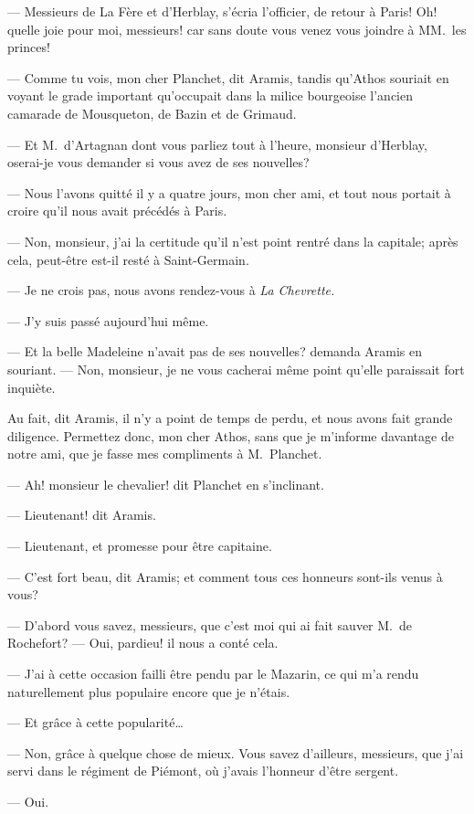 — Messieurs de La Fère et d'Herblay, s'écria l'officier, de retour à Paris! Oh! quelle joie pour moi, messieurs! car sans doute vous venez vous joindre à MM.~les princes!

— Comme tu vois, mon cher Planchet, dit Aramis, tandis qu'Athos souriait en voyant le grade important qu'occupait dans la milice bourgeoise l'ancien camarade de Mousqueton, de Bazin et de Grimaud.

— Et M.~d'Artagnan dont vous parliez tout à l'heure, monsieur d'Herblay, oserai-je vous demander si vous avez de ses nouvelles?

— Nous l'avons quitté il y a quatre jours, mon cher ami, et tout nous portait à croire qu'il nous avait précédés à Paris.

— Non, monsieur, j'ai la certitude qu'il n'est point rentré dans la capitale; après cela, peut-être est-il resté à Saint-Germain.

— Je ne crois pas, nous avons rendez-vous à \textit{La Chevrette.}

— J'y suis passé aujourd'hui même.

— Et la belle Madeleine n'avait pas de ses nouvelles? demanda Aramis en souriant.
— Non, monsieur, je ne vous cacherai même point qu'elle paraissait fort inquiète.

Au fait, dit Aramis, il n'y a point de temps de perdu, et nous avons fait grande diligence. Permettez donc, mon cher Athos, sans que je m'informe davantage de notre ami, que je fasse mes compliments à M.~Planchet.

— Ah! monsieur le chevalier! dit Planchet en s'inclinant.

— Lieutenant! dit Aramis.

— Lieutenant, et promesse pour être capitaine.

— C'est fort beau, dit Aramis; et comment tous ces honneurs sont-ils venus à vous?

— D'abord vous savez, messieurs, que c'est moi qui ai fait sauver M.~de Rochefort?
— Oui, pardieu! il nous a conté cela.

— J'ai à cette occasion failli être pendu par le Mazarin, ce qui m'a rendu naturellement plus populaire encore que je n'étais.

— Et grâce à cette popularité\dots

— Non, grâce à quelque chose de mieux. Vous savez d'ailleurs, messieurs, que j'ai servi dans le régiment de Piémont, où j'avais l'honneur d'être sergent.

— Oui.

